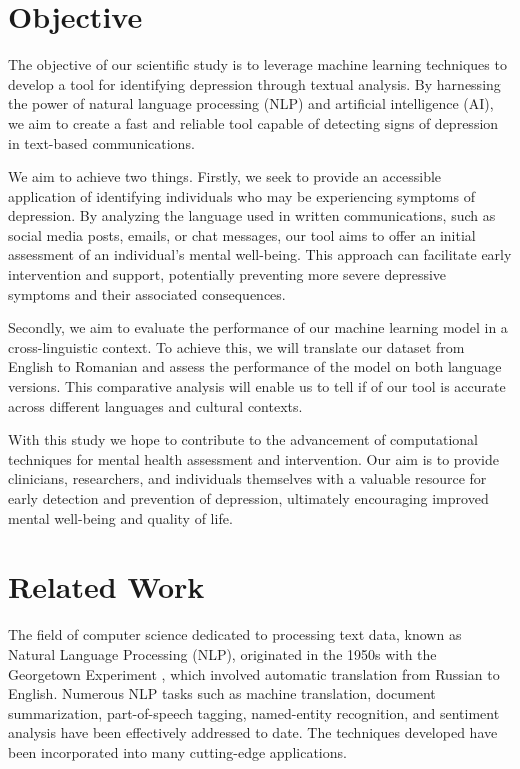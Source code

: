 \section{Objective}
\label{sec:ch1sec2}

\quad The objective of our scientific study is to leverage machine learning techniques to develop a tool for identifying depression through textual analysis. By harnessing the power of natural language processing (NLP) and artificial intelligence (AI), we aim to create a fast and reliable tool capable of detecting signs of depression in text-based communications.

We aim to achieve two things. Firstly, we seek to provide an accessible application of identifying individuals who may be experiencing symptoms of depression. By analyzing the language used in written communications, such as social media posts, emails, or chat messages, our tool aims to offer an initial assessment of an individual's mental well-being. This approach can facilitate early intervention and support, potentially preventing more severe depressive symptoms and their associated consequences.

Secondly, we aim to evaluate the performance of our machine learning model in a cross-linguistic context. To achieve this, we will translate our dataset from English to Romanian and assess the performance of the model on both language versions. This comparative analysis will enable us to tell if of our tool is accurate across different languages and cultural contexts.

With this study we hope to contribute to the advancement of computational techniques for mental health assessment and intervention. Our aim is to provide clinicians, researchers, and individuals themselves with a valuable resource for early detection and prevention of depression, ultimately encouraging improved mental well-being and quality of life.

\section{Related Work}

\quad The field of computer science dedicated to processing text data, known as Natural Language Processing (NLP), originated in the 1950s with the Georgetown Experiment \cite{hutchins2004georgetown}, which involved automatic translation from Russian to English. Numerous NLP tasks such as machine translation, document summarization, part-of-speech tagging, named-entity recognition, and sentiment analysis have been effectively addressed to date. The techniques developed have been incorporated into many cutting-edge applications. 

